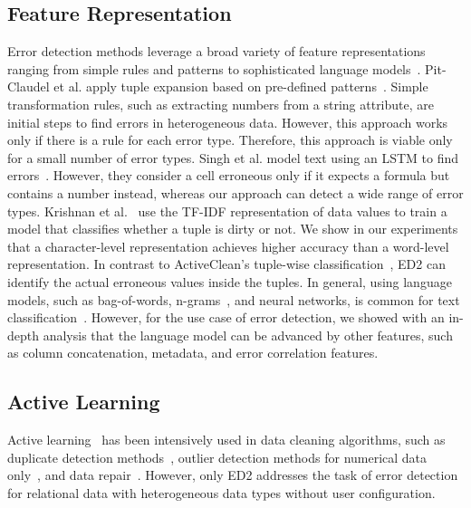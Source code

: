 \subsection{Feature Representation}


Error detection methods leverage a broad variety of feature representations ranging from simple rules and patterns to sophisticated language models~\cite{pit2016outlier, melford-using-neural-networks-find-spreadsheet-errors}.
Pit-Claudel et al. apply tuple expansion based on pre-defined patterns~\cite{pit2016outlier}. Simple transformation rules, such as extracting numbers from a string attribute, are initial steps to find errors in heterogeneous data. However, this approach works only if there is a rule for each error type. Therefore, this approach is viable only for a small number of error types.
Singh et al. model text using an LSTM to find errors~\cite{melford-using-neural-networks-find-spreadsheet-errors}. However, they consider a cell erroneous only if it expects a formula but contains a number instead, whereas our approach can detect a wide range of error types.
Krishnan et al.~\cite{krishnan2016activeclean} use the TF-IDF representation of data values to train a model that classifies whether a tuple is dirty or not. We show in our experiments that a character-level representation achieves higher accuracy than a word-level representation. In contrast to ActiveClean's tuple-wise classification~\cite{krishnan2016activeclean}, ED2 can identify the actual erroneous values inside the tuples. 
In general, using language models, such as bag-of-words, n-grams~\cite{cavnar1994n}, and neural networks, is common for text classification~\cite{joachims1998text, mccallum1998comparison, radford2017learning, zhang2015character}.
However, for the use case of error detection, we showed with an in-depth analysis that the language model can be advanced by other features, such as column concatenation, metadata, and error correlation features.

\subsection{Active Learning}

Active learning~\cite{settles2010active} has been intensively used in data cleaning algorithms, such as duplicate detection methods~\cite{firmani2016online, gokhale2014corleone, papenbrock2015progressive}, outlier detection methods for numerical data only~\cite{abe2006outlier, steinwart2005classification}, and data repair~\cite{krishnan2016activeclean,yakout2011guided}.
However, only ED2 addresses the task of error detection for relational data with heterogeneous data types without user configuration. 

